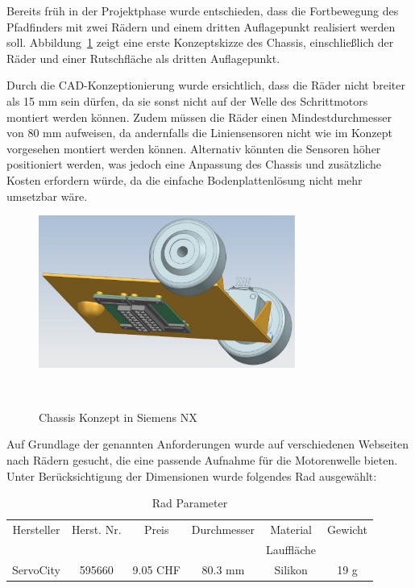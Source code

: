 \documentclass[main.tex]{subfiles} %
\begin{document}
Bereits früh in der Projektphase wurde entschieden, dass die Fortbewegung des Pfadfinders
mit zwei Rädern und einem dritten Auflagepunkt realisiert werden soll.
Abbildung~\ref{fig:Radkonzept} zeigt eine erste Konzeptskizze des Chassis, einschließlich
der Räder und einer Rutschfläche als dritten Auflagepunkt.

Durch die CAD-Konzeptionierung wurde ersichtlich, dass die Räder nicht breiter als 15 mm
sein dürfen, da sie sonst nicht auf der Welle des Schrittmotors montiert werden können.
Zudem müssen die Räder einen Mindestdurchmesser von 80 mm aufweisen, da andernfalls die
Liniensensoren nicht wie im Konzept vorgesehen montiert werden können. Alternativ könnten
die Sensoren höher positioniert werden, was jedoch eine Anpassung des Chassis und zusätzliche
Kosten erfordern würde, da die einfache Bodenplattenlösung nicht mehr umsetzbar wäre.

\begin{figure}[H]
    \centering
    \includegraphics[width=0.75\textwidth]{Radkonzept.pdf}
    \caption{Chassis Konzept in Siemens NX}~\label{fig:Radkonzept}
\end{figure}

Auf Grundlage der genannten Anforderungen wurde auf verschiedenen Webseiten nach Rädern
gesucht, die eine passende Aufnahme für die Motorenwelle bieten. Unter Berücksichtigung
der Dimensionen wurde folgendes Rad ausgewählt:

\begin{table}[h]                                    %
    \centering
    \begin{tabular}{|c|c|c|c|c|c|}                        %
        \hline
        Hersteller  & Herst. Nr.    & Preis     & Durchmesser   & Material      & Gewicht   \\
                    &               &           &               & Lauffläche    &           \\ \hline
        ServoCity   & 595660        & 9.05 CHF  & 80.3 mm       & Silikon       & 19 g      \\ \hline
    \end{tabular}
    \caption{Rad Parameter}
    \label{tab:Rad_Parameter}
\end{table}
\end{document}
